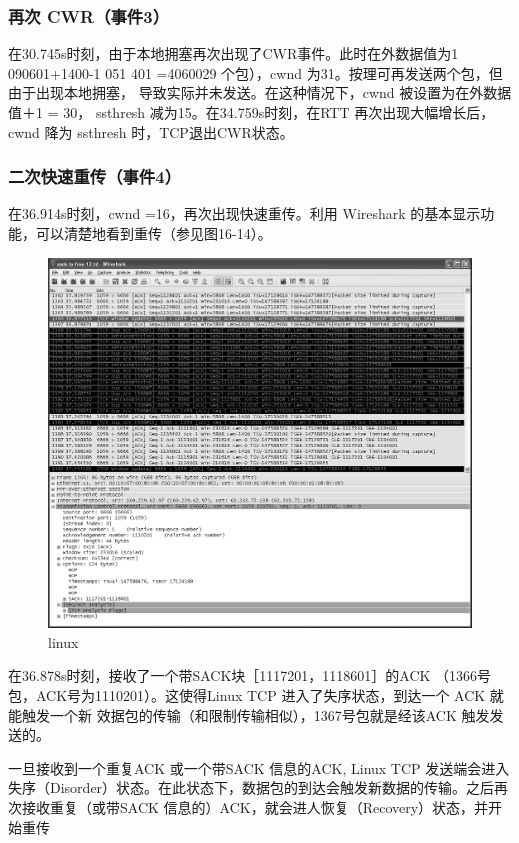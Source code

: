 \subsubsection{再次 CWR（事件3）}
在30.745s时刻，由于本地拥塞再次出现了CWR事件。此时在外数据值为1 090601+1400-1 051 401 =4060029 个包），cwnd 为31。按理可再发送两个包，但由于出现本地拥塞，
导致实际并未发送。在这种情况下，cwnd 被设置为在外数据值＋1 = 30， ssthresh 减为15。在34.759s时刻，在RTT 再次出现大幅增长后，cwnd 降为 ssthresh 时，TCP退出CWR状态。

\subsubsection{二次快速重传（事件4）}
在36.914s时刻，cwnd =16，再次出现快速重传。利用 Wireshark 的基本显示功能，可以清楚地看到重传（参见图16-14）。
\begin{figure}[!htb]
    \centering
	\includegraphics[width=1\textwidth]{imgs/16/16-14.png}
	\caption{linux}
\end{figure}
在36.878s时刻，接收了一个带SACK块［1117201，1118601］的ACK （1366号包，ACK号为1110201）。这使得Linux TCP 进入了失序状态，到达一个 ACK 就能触发一个新
效据包的传输（和限制传输相似），1367号包就是经该ACK 触发发送的。

一旦接收到一个重复ACK 或一个带SACK 信息的ACK, Linux TCP 发送端会进入失序（Disorder）状态。在此状态下，数据包的到达会触发新数据的传输。之后再次接收重复（或带SACK 信息的）ACK，就会进人恢复（Recovery）状态，并开始重传

